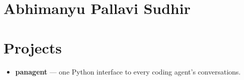 \documentclass[11pt]{article}
\begin{document}
\section*{Abhimanyu Pallavi Sudhir}

\section*{Projects}
\begin{itemize}
  \item \textbf{panagent} --- one Python interface to every coding agent's conversations.
\end{itemize}
\end{document}
